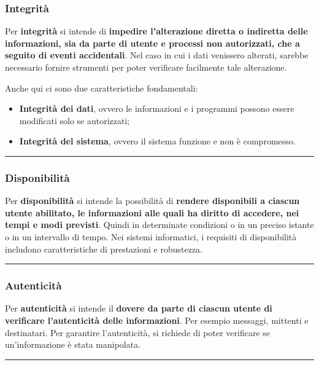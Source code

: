 \documentclass[a4paper]{article}
\newcommand{\longline}{\noindent\rule{\textwidth}{0.4pt}}
\begin{document}
	\subsubsection{Integrità}
	
	Per \textcolor{Red3}{\textbf{integrità}} si intende di \textbf{impedire l'alterazione diretta o indiretta delle informazioni, sia da parte di utente e processi non autorizzati, che a seguito di eventi accidentali}. Nel caso in cui i dati venissero alterati, sarebbe necessario fornire strumenti per poter verificare facilmente tale alterazione.\newline
	
	\noindent
	Anche qui ci sono due caratteristiche fondamentali:
	\begin{itemize}
		\item \textbf{Integrità dei dati}, ovvero le informazioni e i programmi possono essere modificati solo se autorizzati;
		
		\item \textbf{Integrità del sistema}, ovvero il sistema funzione e non è compromesso.
	\end{itemize}

	\longline
	
	\subsubsection{Disponibilità}
	
	Per \textcolor{Red3}{\textbf{disponibilità}} si intende la possibilità di \textbf{rendere disponibili a ciascun utente abilitato, le informazioni alle quali ha diritto di accedere, nei tempi e modi previsti}. Quindi in determinate condizioni o in un preciso istante o in un intervallo di tempo. Nei sistemi informatici, i requisiti di disponibilità includono caratteristiche di prestazioni e robustezza.
	
	\longline
	
	\subsubsection{Autenticità}
	
	Per \textcolor{Red3}{\textbf{autenticità}} si intende il \textbf{dovere da parte di ciascun utente di verificare l'autenticità delle informazioni}. Per esempio messaggi, mittenti e destinatari. Per garantire l'autenticità, si richiede di poter verificare se un'informazione è stata manipolata.
	
	\longline
	
\end{document}
